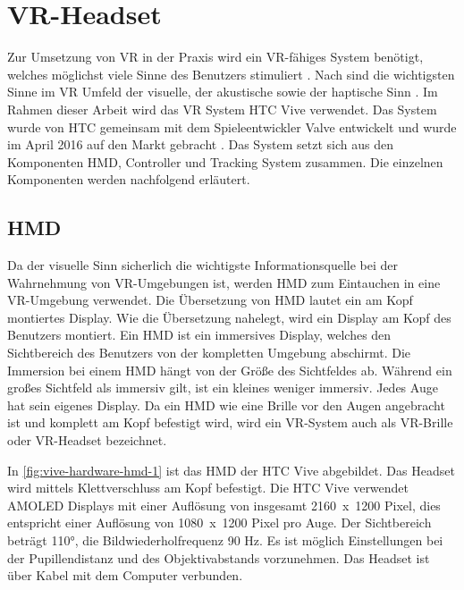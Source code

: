 \section{\acs{VR}-Headset}
Zur Umsetzung von \ac{VR} in der Praxis wird ein \ac{VR}-fähiges System benötigt, welches möglichst viele Sinne des Benutzers stimuliert \cite{Doerner2019}. Nach \citeauthor{DoernerWahrnehmung} sind die wichtigsten Sinne im \ac{VR} Umfeld der visuelle, der akustische sowie der haptische Sinn \cite{DoernerWahrnehmung}. Im Rahmen dieser Arbeit wird das \acs{VR} System HTC Vive verwendet. Das System wurde von HTC gemeinsam mit dem Spieleentwickler Valve entwickelt und wurde im April 2016 auf den Markt gebracht \cite{Fehrenbach.14.4.2016}. Das System setzt sich aus den Komponenten \ac{HMD}, Controller und Tracking System zusammen. Die einzelnen Komponenten werden nachfolgend erläutert.

\subsection{\acl{HMD}}
Da der visuelle Sinn \glqq sicherlich die wichtigste Informationsquelle bei der Wahrnehmung\grqq \cite{DoernerWahrnehmung} von \ac{VR}-Umgebungen ist, werden \ac{HMD} zum Eintauchen in eine \ac{VR}-Umgebung verwendet. Die Übersetzung von \ac{HMD} lautet \glqq ein am Kopf montiertes Display\grqq. Wie die Übersetzung nahelegt, wird ein Display am Kopf des Benutzers montiert. Ein \ac{HMD} ist ein immersives Display, welches den Sichtbereich des Benutzers von der kompletten Umgebung abschirmt. Die Immersion bei einem \ac{HMD} hängt von der Größe des Sichtfeldes ab. Während ein großes Sichtfeld als immersiv gilt, ist ein kleines weniger immersiv. \cite{Doerner2019} Jedes Auge hat sein eigenes Display. Da ein \ac{HMD} wie eine Brille vor den Augen angebracht ist und komplett am Kopf befestigt wird, wird ein \ac{VR}-System auch als \ac{VR}-Brille oder \ac{VR}-Headset bezeichnet.

In \autoref{fig:vive-hardware-hmd-1} ist das \ac{HMD} der HTC Vive abgebildet. Das Headset wird mittels Klettverschluss am Kopf befestigt. Die HTC Vive verwendet AMOLED Displays mit einer Auflösung von insgesamt \mbox{2160 x 1200} Pixel, dies entspricht einer Auflösung von \mbox{1080 x 1200} Pixel pro Auge. Der Sichtbereich beträgt 110°, die Bildwiederholfrequenz 90 Hz. Es ist möglich Einstellungen bei der Pupillendistanz und des Objektivabstands vorzunehmen. Das Headset ist über Kabel mit dem Computer verbunden. \cite{ViveProduct}


